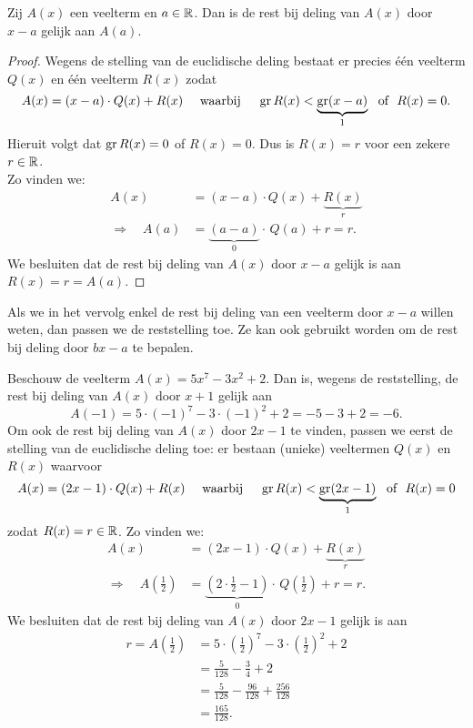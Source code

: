 \documentclass{ximera}
\begin{document}
	\begin{theorem} 
	Zij $A(x)$ een veelterm en $a \in \mathbb{R}$. Dan is de rest bij deling van $A(x)$ door $x-a$ gelijk aan $A(a)$.
	\end{theorem} 
	
	
	\begin{proof}
	
	Wegens de stelling van de euclidische deling bestaat er precies  \'e\'en veelterm $Q(x)$ en \'e\'en veelterm $R(x)$ zodat
	\[
	A(x) = (x-a)\cdot Q(x) + R(x) \quad \text{ waarbij } \quad \operatorname{gr} R(x) < \underbrace{\operatorname{gr} (x-a)}_{1} \,\, \text{ of } \,\, R(x) = 0.
	\]
	Hieruit volgt dat $\operatorname{gr} R(x) = 0$ of $R(x) = 0$. Dus is $R(x) = r$ voor een zekere $r \in \mathbb{R}$. \\
	Zo vinden we:
	\begin{align*}
	A(x) & = (x-a) \cdot Q(x) + \underbrace{R(x)}_{r} \\
	\Rightarrow \quad A(a) & = \underbrace{(a-a)}_{0} \cdot \, Q(a) + r = r. 
	\end{align*}
	We besluiten dat de rest bij deling van $A(x)$ door $x-a$ gelijk is aan $R(x) = r = A(a)$. 
	
	\end{proof}
	
	
	Als we in het vervolg enkel de rest bij deling van een veelterm door $x-a$ willen weten, dan passen we de reststelling toe. Ze kan ook gebruikt worden om de rest bij deling door $bx-a$ te bepalen. 
	
	\begin{example} 
	Beschouw de veelterm $A(x) = 5x^7 - 3x^2 + 2$. Dan is, wegens de reststelling, de rest bij deling van $A(x)$ door $x+1$ gelijk aan
	\[
	A(-1) = 5 \cdot (-1)^7 - 3 \cdot (-1)^2 + 2 = -5-3+2 = -6.
	\]
	Om ook de rest bij deling van $A(x)$ door $2x-1$ te vinden, passen we eerst de stelling van de euclidische deling toe: er bestaan (unieke) veeltermen $Q(x)$ en $R(x)$ waarvoor
	\[
	A(x) = (2x-1)\cdot Q(x) + R(x) \quad \text{ waarbij } \quad \operatorname{gr} R(x) < \underbrace{\operatorname{gr} (2x-1)}_{1} \,\, \text{ of } \,\, R(x) = 0
	\]
	zodat $R(x) = r \in \mathbb{R}$. Zo vinden we:
	\begin{align*}
	A(x) & = (2x-1) \cdot Q(x) + \underbrace{R(x)}_{r} \\
	\Rightarrow \quad A\left(\frac{1}{2}\right) & = \underbrace{\left(2 \cdot \frac{1}{2}-1\right)}_{0} \cdot \,Q\left(\frac{1}{2}\right) + r = r. 
	\end{align*} 
	We besluiten dat de rest bij deling van $A(x)$ door $2x-1$ gelijk is aan
	\begin{align*}
	r = A\left(\frac{1}{2}\right) & = 5 \cdot \left(\frac{1}{2}\right)^7 - 3 \cdot \left(\frac{1}{2}\right)^2 + 2 \\
	& = \frac{5}{128} - \frac{3}{4} + 2 \\
	& = \frac{5}{128} - \frac{96}{128} + \frac{256}{128} \\
	& = \frac{165}{128}.
	\end{align*}
	\end{example} 
	
	
	
	
	
	
\end{document}
